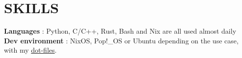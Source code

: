 \section{SKILLS}
\begin{itemize}[leftmargin=0in, label={}]
    \small{\item{
                    \textbf{Languages} {: Python, C/C++, Rust, Bash and Nix are all used almost daily}\vspace{2pt} \\
                    \textbf{Dev environment} {: NixOS, Pop!\_OS or Ubuntu depending on the use case, with my \href{https://github.com/colefuerth/dot-files}{dot-files}.}\vspace{2pt}
              }}
\end{itemize}
